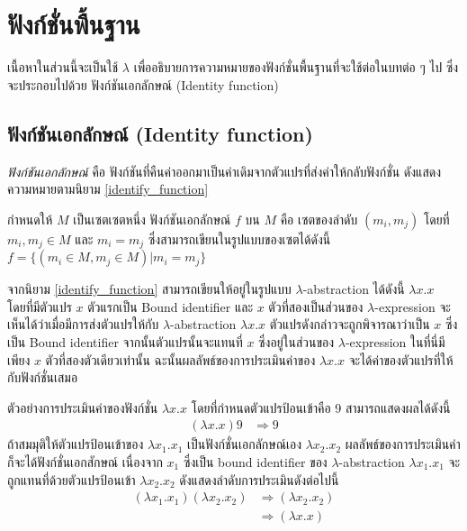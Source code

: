 \chapter{ฟังก์ชั่นพื้นฐาน}
%
\par{
เนื้อหาในส่วนนี้จะเป็นใช้ $\lambda$ 
เพื่ออธิบายการความหมายของฟังก์ชั่นพื้นฐานที่จะใช้ต่อในบทต่อ ๆ ไป
ซึ่งจะประกอบไปด้วย ฟังก์ชันเอกลักษณ์ (Identity function)
}
%
\section{ฟังก์ชันเอกลักษณ์ (Identity function)}
%
\par{
\textit{ฟังก์ชันเอกลักษณ์} คือ 
ฟังก์ชันที่คืนค่าออกมาเป็นค่าเดิมจากตัวแปรที่ส่งค่าให้กลับฟังก์ชั่น
ดังแสดงความหมายตามนิยาม \ref{identify_function}
}
%
\begin{defn}
\label{identify_function}
กำหนดให้ $M$ เป็นเซตเซตหนึ่ง 
ฟังก์ชันเอกลักษณ์ $f$ บน $M$ 
คือ เซตของลำดับ $(m_i,m_j)$ 
โดยที่ $m_i,m_j \in M$ และ $m_i = m_j$ 
ซึ่งสามารถเขียนในรูปแบบของเซตได้ดังนี้
$f = \{(m_i \in M ,m_j \in M)| m_i = m_j\}$
\end{defn}
%
\par{
จากนิยาม \ref{identify_function} 
สามารถเขียนให้อยู่ในรูปแบบ $\lambda$-abstraction ได้ดังนี้
$\lambda x.x$ โดยที่มีตัวแปร $x$ ตัวแรกเป็น Bound identifier
และ $x$ ตัวที่สองเป็นส่วนของ $\lambda$-expression
จะเห็นได้ว่าเมื่อมีการส่งตัวแปรให้กับ $\lambda$-abstraction 
$\lambda x.x$ ตัวแปรดังกล่าวจะถูกพิจารณาว่าเป็น $x$ 
ซึ่งเป็น Bound identifier จากนั้นตัวแปรนั้นจะแทนที่ $x$ 
ซึ่งอยู่ในส่วนของ $\lambda$-expression ในที่นี่มีเพียง 
$x$ ตัวที่สองตัวเดียวเท่านั้น
ฉะนั้นผลลัพธ์ของการประเมินค่าของ $\lambda x.x$ 
จะได้ค่าของตัวแปรที่ให้กับฟังก์ชั่นเสมอ
}
%
\par{
ตัวอย่างการประเมินค่าของฟังก์ชั่น $\lambda x.x$ 
โดยที่กำหนดตัวแปรป้อนเข้าคือ 9 สามารถแสดงผลได้ดังนี้
%
\begin{align*}
(\lambda x.x) 9 & \Rightarrow 9
\end{align*}
%
ถ้าสมมุติให้ตัวแปรป้อนเข้าของ $\lambda x_1.x_1$ 
เป็นฟังก์ชั่นเอกลักษณ์เอง $\lambda x_2.x_2$ ผลลัพธ์ของการประเมินค่า
ก็จะได้ฟังก์ชั่นเอกสักษณ์ เนื่องจาก $x_1$ ซึ่งเป็น bound identifier ของ $\lambda$-abstraction $\lambda x_1.x_1$ 
จะถูกแทนที่ด้วยตัวแปรป้อนเข้า $\lambda x_2.x_2$
ดังแสดงลำดับการประเมินดังต่อไปนี้
%
\begin{align*}
(\lambda x_1.x_1)(\lambda x_2.x_2) & \Rightarrow (\lambda x_2.x_2) \\
& \Rightarrow (\lambda x.x) \\
\end{align*}
%
}

